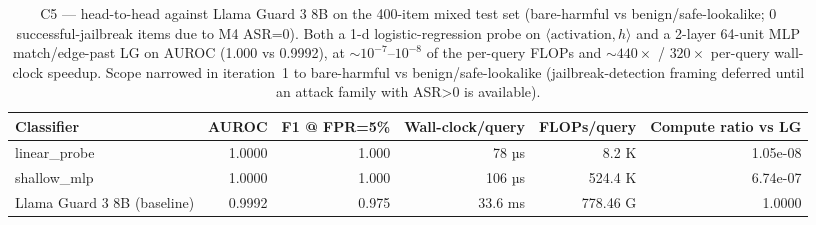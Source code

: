 \begin{table}[t]
\centering
\caption{C5 — head-to-head against Llama Guard 3 8B on the 400-item mixed test set (bare-harmful vs benign/safe-lookalike; 0 successful-jailbreak items due to M4 ASR=0). Both a 1-d logistic-regression probe on $\langle \text{activation}, h\rangle$ and a 2-layer 64-unit MLP match/edge-past LG on AUROC (1.000 vs 0.9992), at $\sim\!10^{-7}$--$10^{-8}$ of the per-query FLOPs and $\sim\!440\times$ / $320\times$ per-query wall-clock speedup. Scope narrowed in iteration~1 to bare-harmful vs benign/safe-lookalike (jailbreak-detection framing deferred until an attack family with ASR>0 is available).}
\label{tab:c5_probe_vs_lg}
\begin{tabular}{lrrrrr}
\toprule
Classifier & AUROC & F1 @ FPR=5\% & Wall-clock/query & FLOPs/query & Compute ratio vs LG \\
\midrule
linear\_probe & 1.0000 & 1.000 & 78 µs & 8.2 K & 1.05e-08 \\
shallow\_mlp & 1.0000 & 1.000 & 106 µs & 524.4 K & 6.74e-07 \\
Llama Guard 3 8B (baseline) & 0.9992 & 0.975 & 33.6 ms & 778.46 G & 1.0000 \\
\bottomrule
\end{tabular}
\end{table}

